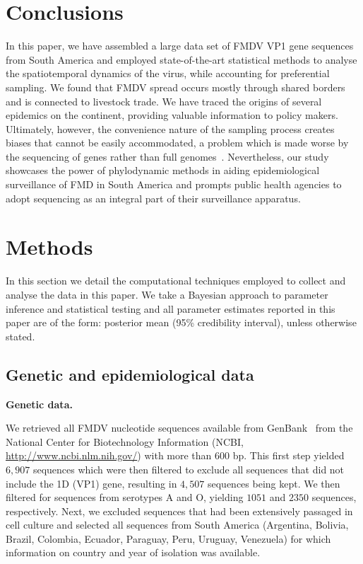 \documentclass[10pt]{article}
\begin{document}
\section*{Conclusions}

In this paper, we have assembled a large data set of FMDV VP1 gene sequences from South America and employed state-of-the-art statistical methods to analyse the spatiotemporal dynamics of the virus, while accounting for preferential sampling. %
We found that FMDV spread occurs mostly through shared borders and  is connected to livestock trade.
We have traced the origins of several epidemics on the continent, providing valuable information to policy makers.
Ultimately, however, the convenience nature of the sampling process creates biases that cannot be easily accommodated, a problem which is made worse by the sequencing of genes rather than full genomes~\citep{Dudas2019}.
Nevertheless, our study showcases the power of phylodynamic methods in aiding epidemiological surveillance of FMD in South America and prompts public health agencies to adopt sequencing as an integral part of their surveillance apparatus. 



\section*{Methods}

In this section we detail the computational techniques employed to collect and analyse the data in this paper.
We take a Bayesian approach to parameter inference and statistical testing and all parameter estimates reported in this paper are of the form: posterior mean (95\% credibility interval), unless otherwise stated.

\subsection*{Genetic and epidemiological data}

\textbf{Genetic data.}

We retrieved all FMDV nucleotide sequences available from GenBank~\citep{Benson2013} from the National Center for Biotechnology Information (NCBI, \url{ http://www.ncbi.nlm.nih.gov/}) with more than $600$ bp.
This first step yielded $6,907$ sequences which were then filtered to exclude all sequences that did not include the 1D (VP1) gene, resulting in $4,507$ sequences being kept.
We then filtered for sequences from serotypes A and O, yielding $1051$ and $2350$ sequences, respectively.
Next, we excluded sequences that had been extensively passaged in cell culture and selected all sequences from South America (Argentina, Bolivia, Brazil, Colombia, Ecuador, Paraguay, Peru, Uruguay, Venezuela) for which information on country and year of isolation was available.
\end{document}
